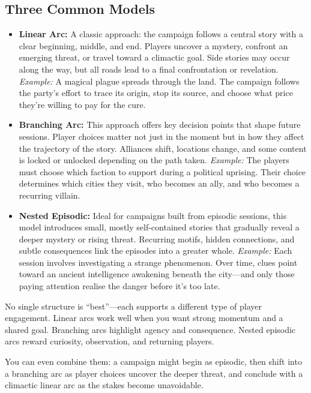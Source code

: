 \subsection*{Three Common Models}

\begin{itemize}
    \item \textbf{Linear Arc:}  
    A classic approach: the campaign follows a central story with a clear beginning, middle, and end. Players uncover a mystery, confront an emerging threat, or travel toward a climactic goal. Side stories may occur along the way, but all roads lead to a final confrontation or revelation.  
    \emph{Example:} A magical plague spreads through the land. The campaign follows the party’s effort to trace its origin, stop its source, and choose what price they’re willing to pay for the cure.

    \item \textbf{Branching Arc:}  
    This approach offers key decision points that shape future sessions. Player choices matter not just in the moment but in how they affect the trajectory of the story. Alliances shift, locations change, and some content is locked or unlocked depending on the path taken.  
    \emph{Example:} The players must choose which faction to support during a political uprising. Their choice determines which cities they visit, who becomes an ally, and who becomes a recurring villain.

    \item \textbf{Nested Episodic:}  
    Ideal for campaigns built from episodic sessions, this model introduces small, mostly self-contained stories that gradually reveal a deeper mystery or rising threat. Recurring motifs, hidden connections, and subtle consequences link the episodes into a greater whole.  
    \emph{Example:} Each session involves investigating a strange phenomenon. Over time, clues point toward an ancient intelligence awakening beneath the city—and only those paying attention realise the danger before it’s too late.
\end{itemize}

No single structure is “best”—each supports a different type of player engagement. Linear arcs work well when you want strong momentum and a shared goal. Branching arcs highlight agency and consequence. Nested episodic arcs reward curiosity, observation, and returning players.

You can even combine them: a campaign might begin as episodic, then shift into a branching arc as player choices uncover the deeper threat, and conclude with a climactic linear arc as the stakes become unavoidable.

